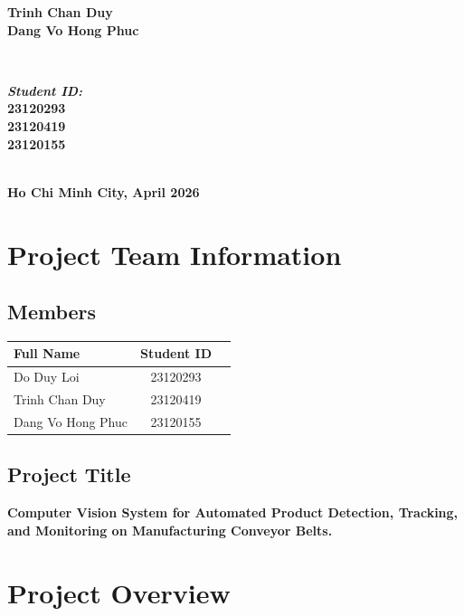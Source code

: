\documentclass[12pt,a4paper]{report}
\makeatletter
\renewcommand\tableofcontents{%
    \begin{center}
      {\Large\bfseries \contentsname} 
      \par\nobreak
      \vspace{10pt} 
    \end{center}
    \@starttoc{toc}
}
\makeatother
\begin{document}
\begin{titlepage}
\begin{center}
\begin{minipage}{0.45\textwidth}
\begin{flushleft}
{\bf Trinh Chan Duy}\\
{\bf Dang Vo Hong Phuc}
\end{flushleft}
\end{minipage}
~
\begin{minipage}{0.4\textwidth}
\begin{flushright} \large
\emph{{\bf Student ID:}} \\
{\bf 23120293}\\
{\bf 23120419}\\
{\bf 23120155}
\end{flushright}
\end{minipage}\\
\vfill
{\bf Ho Chi Minh City, April 2026}
\end{center}
\end{titlepage}

\tableofcontents
\newpage
{}

\chapter{Project Team Information}
\renewcommand{\arraystretch}{1.2}

\section{Members}
\begin{center}
\begin{tabularx}{\textwidth}{l c X}
\toprule
\textbf{Full Name} & \textbf{Student ID}  \\ 
\midrule
Do Duy Loi & 23120293  \\
Trinh Chan Duy   & 23120419  \\ 
Dang Vo Hong Phuc   & 23120155  \\
\bottomrule
\end{tabularx}
\end{center}

\section{Project Title}
\textbf{Computer Vision System for Automated Product Detection, Tracking, and Monitoring on Manufacturing Conveyor Belts.}

\chapter{Project Overview}
\end{document}
